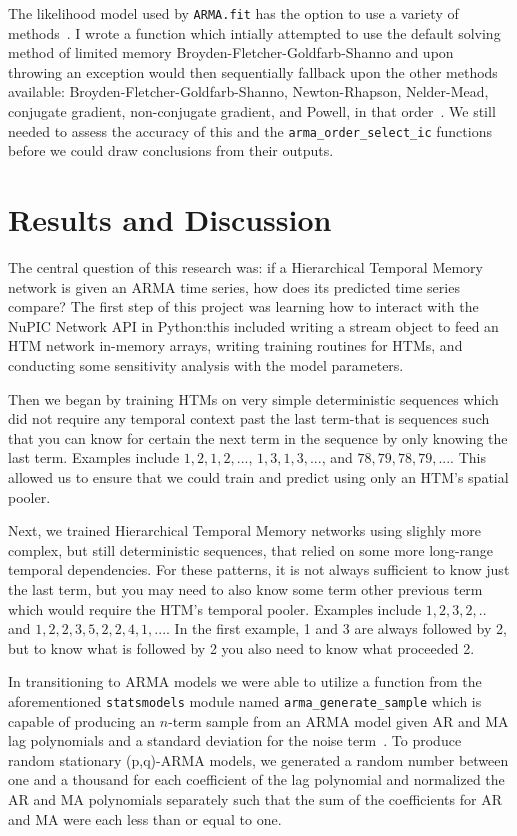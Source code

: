 \documentclass[oneside,12pt,openany]{book}
\begin{document}
	The likelihood model used by \texttt{ARMA.fit} has the option to use a variety of methods~\cite{statsmodels}. I wrote a function which intially attempted to use the default solving method of limited memory Broyden-Fletcher-Goldfarb-Shanno and upon throwing an exception would then sequentially fallback upon the other methods available: Broyden-Fletcher-Goldfarb-Shanno, Newton-Rhapson, Nelder-Mead, conjugate gradient, non-conjugate gradient, and Powell, in that order~\cite{statsmodels}. We still needed to assess the accuracy of this and the \texttt{arma\_order\_select\_ic} functions before we could draw conclusions from their outputs.
	
	
	
	
	\chapter{Results and Discussion}

	The central question of this research was: if a Hierarchical Temporal Memory network is given an ARMA time series, how does its predicted time series compare? The first step of this project was learning how to interact with the NuPIC Network API in Python:this included writing a stream object to feed an HTM network in-memory arrays, writing training routines for HTMs, and conducting some sensitivity analysis with the model parameters. 
	
	Then we began by training HTMs on very simple deterministic sequences which did not require any temporal context past the last term-that is sequences such that you can know for certain the next term in the sequence by only knowing the last term. Examples include $1,2,1,2,...$, $1,3,1,3,...$, and $78,79,78,79,...$. This allowed us to ensure that we could train and predict using only an HTM's spatial pooler.

	Next, we trained Hierarchical Temporal Memory networks using slighly more complex, but still deterministic sequences, that relied on some more long-range temporal dependencies. For these patterns, it is not always sufficient to know just the last term, but you may need to also know some term other previous term which would require the HTM's temporal pooler. Examples include $1,2,3,2,..$ and $1,2,2,3,5,2,2,4,1,...$. In the first example, 1 and 3 are always followed by 2, but to know what is followed by 2 you also need to know what proceeded 2.

	In transitioning to ARMA models we were able to utilize a function from the aforementioned \texttt{statsmodels} module named \texttt{arma\_generate\_sample} which is capable of producing an $n$-term sample from an ARMA model given AR and MA lag polynomials and a standard deviation for the noise term~\cite{statsmodels}. To produce random stationary (p,q)-ARMA models, we generated a random number between one and a thousand for each coefficient of the lag polynomial and normalized the AR and MA polynomials separately such that the sum of the coefficients for AR and MA were each less than or equal to one.
	
\end{document}
